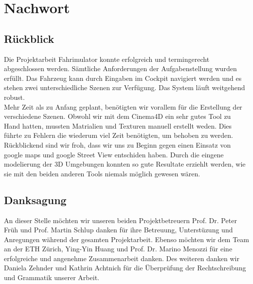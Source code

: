 \section{Nachwort}
\subsection{Rückblick}
Die Projektarbeit Fahrimulator konnte erfolgreich und termingerecht abgeschlossen werden. Sämtliche Anforderungen der Aufgabenstellung wurden erfüllt. Das Fahrzeug kann durch Eingaben im Cockpit navigiert werden und es stehen zwei unterschiedliche Szenen zur Verfügung. Das System läuft weitgehend robust.\\
Mehr Zeit als zu Anfang geplant, benötigten wir vorallem für die Erstellung der verschiedene Szenen. Obwohl wir mit dem Cinema4D ein sehr gutes Tool zu Hand hatten, mussten Matrialien und Texturen manuell erstellt weden. Dies führte zu Fehlern die wiederum viel Zeit benötigten, um behoben zu werden.\\
Rückblickend sind wir froh, dass wir uns zu Beginn gegen einen Einsatz von google maps und google Street View entschiden haben. Durch die eingene modelierung der 3D Umgebungen konnten so gute Resultate erziehlt werden, wie sie mit den beiden anderen Tools niemals möglich gewesen wären. 
\subsection{Danksagung}
An dieser Stelle möchten wir unseren beiden Projektbetreuern  Prof. Dr. Peter Früh und Prof. Martin Schlup danken für ihre Betreuung, Unterstüzung und Anregungen während der gesamten Projektarbeit. Ebenso möchten wir dem Team an der ETH Zürich, Ying-Yin Huang und Prof. Dr. Marino Menozzi für eine erfolgreiche und angenehme Zusammenarbeit danken. Des weiteren danken wir Daniela Zehnder und Kathrin Achtnich für die Überprüfung der Rechtschreibung und Grammatik unserer Arbeit.
